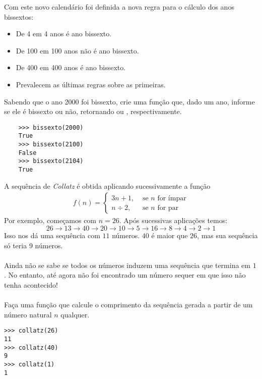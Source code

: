 \documentclass[12pt]{article}
\begin{document}
	Com este novo calendário foi definida a nova regra para o cálculo dos anos bissextos:
	
	\begin{itemize}
		\item De 4 em 4 anos é ano bissexto.
		\item De 100 em 100 anos não é ano bissexto.
		\item De 400 em 400 anos é ano bissexto.
		\item Prevalecem as últimas regras sobre as primeiras.
	\end{itemize}
	
	\quest Sabendo que o ano 2000 foi bissexto, crie uma função que, dado um ano, informe se ele é bissexto ou não, retornando  ou , respectivamente.\\
	
	\example
	\begin{lstlisting}
	>>> bissexto(2000)
	True
	>>> bissexto(2100)
	False
	>>> bissexto(2104)
	True
	\end{lstlisting}
	
	\pagebreak
	
	
	\pagebreak
	
	
	A sequência de \emph{Collatz} é obtida aplicando sucessivamente a função
	{\large
	\begin{align*}
		f(n) = \begin{cases}
		3n + 1, &\text{ se } n \text{ for ímpar}\\
		n \div 2, &\text{ se } n \text{ for par}
		\end{cases}
	\end{align*}
	}
	Por exemplo, começamos com $n = 26$. Após sucessivas aplicações temos:
		$$26 \to 13 \to 40 \to 20 \to 10 \to 5 \to 16 \to 8 \to 4 \to 2 \to 1$$
	Isso nos dá uma sequência com $11$ números. $40$ é maior que $26$, mas sua sequência só teria $9$ números.\\
	\\
	Ainda não se sabe se todos os números induzem uma sequência que termina em $1$. No entanto, até agora não foi encontrado um número sequer em que isso não tenha acontecido!\\
	\\
	\quest Faça uma função que calcule o comprimento da sequência gerada a partir de um número natural $n$ qualquer.\\

	\example
	\begin{lstlisting}
>>> collatz(26)
11
>>> collatz(40)
9
>>> collatz(1)
1
	\end{lstlisting}
	
\end{document}
